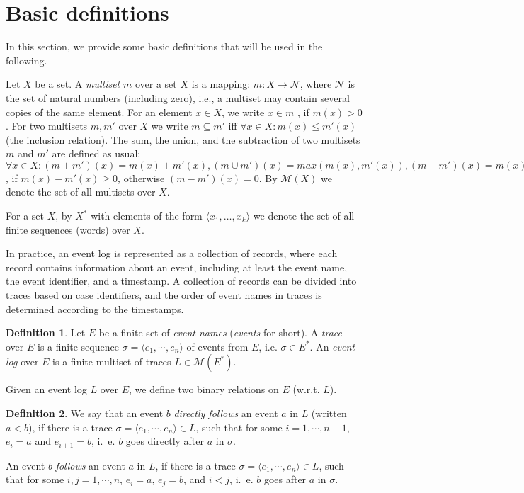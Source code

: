 \documentclass[11pt]{article}
\theoremstyle{definition}
\newtheorem{definition}{Definition}
\begin{document}
\section{Basic definitions}\label{sec:definitions}

In this section, we provide some basic definitions that will be used in the following.

Let $X$ be a set. A \emph{multiset} $m$ over a set $X$ is a mapping: $m : X \rightarrow \mathcal{N}$, where $\mathcal{N}$  is the set of natural numbers (including zero), i.e., a multiset may contain several copies of the same element. 
For an element $x\in X$, we write  $x\in m$ , if $m(x) >0$.
For two multisets $m,m'$ over $X$ we write $m\subseteq m'$  iff $\forall x\in X: m(x) \leq m'(x)$ (the inclusion relation). 
The sum, the union, and the subtraction of two multisets $m$ and $m'$ are defined as usual:
$\forall x\in X: (m+m')(x)=m(x)+m'(x), (m\cup m')(x)=max(m(x),m'(x)), (m-m')(x)=m(x) - m'(x)$, if $m(x) - m'(x) \geq 0$, otherwise $(m-m')(x)= 0$.
By $\mathcal{M}(X)$ we denote the set of all multisets over $X$.

For a set $X$, by $X^*$ with elements of the form $\langle x_1,\dots, x_k \rangle$ we denote the set of all finite sequences (words) over $X$.

In practice, an event log is represented as a collection of records, where each record contains information about an event, including at least the event name, the event identifier, and a timestamp. A collection of records can be divided into traces based on case identifiers, and the order of event names in traces is determined according to the timestamps.

\begin{definition}%
Let $E$ be a finite set of \textit{event names} (\textit{events} for short). 
A \textit{trace} over $E$ is a finite sequence $\sigma = \langle e_1, \cdots, e_n \rangle$ of events from $E$, i.e. $\sigma \in E^*$. An \textit{event log} over $E$ is a finite multiset of traces $L \in \mathcal{M}(E^*)$. 
\end{definition}


Given an event log $L$ over $E$, we define two binary relations on $E$ (w.r.t. $L$).

\begin{definition}%
We say that an event $b$ \textit{directly follows} an event $a$ in $L$ (written $a < b$), if there is a trace $\sigma= \langle e_1, \cdots, e_n \rangle\in L$, such that for some $i=1,\cdots, n-1$, $e_i = a$ and $e_{i+1} = b$, i.\ e. $b$ goes directly after $a$ in $\sigma$.

An event $b$ \textit{follows} an event $a$ in $L$, if 
there is a trace $\sigma= \langle e_1, \cdots, e_n \rangle\in L$, such that for some $i,j=1,\cdots, n$, $e_i = a$, $e_j = b$, and $i<j$, i.\ e. $b$ goes  after $a$ in $\sigma$.
\end{definition}
\end{document}
